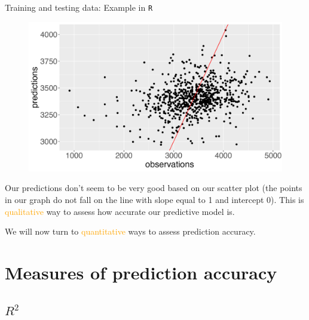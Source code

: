 \documentclass[10pt,t]{beamer}
\begin{document}
\begin{frame}{Training and testing data: Example in \texttt{R}}
\begin{figure}
	\centering \includegraphics[scale=0.3]{predict_vs_obs2.png}
\end{figure}

Our predictions don't seem to be very good based on our scatter plot (the points in our graph do not fall on the line with slope equal to 1 and intercept 0). This is \textcolor{orange}{qualitative} way to assess how accurate our predictive model is.

\vspace{0.3cm}

We will now turn to \textcolor{orange}{quantitative} ways to assess prediction accuracy.
\end{frame}


\section{Measures of prediction accuracy}

\subsection{$R^2$}
\end{document}
